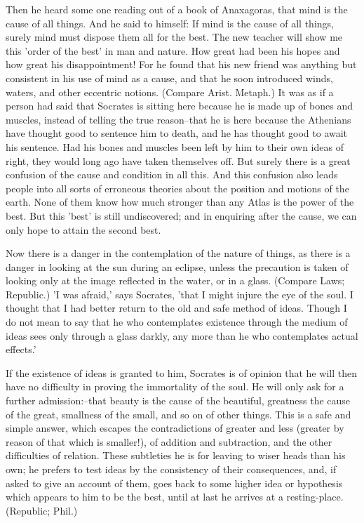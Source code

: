 Then he heard some one reading out of a book of Anaxagoras, that mind is
the cause of all things. And he said to himself: If mind is the cause
of all things, surely mind must dispose them all for the best. The new
teacher will show me this 'order of the best' in man and nature. How
great had been his hopes and how great his disappointment! For he found
that his new friend was anything but consistent in his use of mind as
a cause, and that he soon introduced winds, waters, and other eccentric
notions. (Compare Arist. Metaph.) It was as if a person had said that
Socrates is sitting here because he is made up of bones and muscles,
instead of telling the true reason--that he is here because the
Athenians have thought good to sentence him to death, and he has thought
good to await his sentence. Had his bones and muscles been left by him
to their own ideas of right, they would long ago have taken themselves
off. But surely there is a great confusion of the cause and condition
in all this. And this confusion also leads people into all sorts of
erroneous theories about the position and motions of the earth. None of
them know how much stronger than any Atlas is the power of the best. But
this 'best' is still undiscovered; and in enquiring after the cause, we
can only hope to attain the second best.

Now there is a danger in the contemplation of the nature of things, as
there is a danger in looking at the sun during an eclipse, unless the
precaution is taken of looking only at the image reflected in the water,
or in a glass. (Compare Laws; Republic.) 'I was afraid,' says Socrates,
'that I might injure the eye of the soul. I thought that I had better
return to the old and safe method of ideas. Though I do not mean to say
that he who contemplates existence through the medium of ideas sees
only through a glass darkly, any more than he who contemplates actual
effects.'

If the existence of ideas is granted to him, Socrates is of opinion that
he will then have no difficulty in proving the immortality of the soul.
He will only ask for a further admission:--that beauty is the cause of
the beautiful, greatness the cause of the great, smallness of the small,
and so on of other things. This is a safe and simple answer, which
escapes the contradictions of greater and less (greater by reason of
that which is smaller!), of addition and subtraction, and the other
difficulties of relation. These subtleties he is for leaving to wiser
heads than his own; he prefers to test ideas by the consistency of their
consequences, and, if asked to give an account of them, goes back to
some higher idea or hypothesis which appears to him to be the best,
until at last he arrives at a resting-place. (Republic; Phil.)

